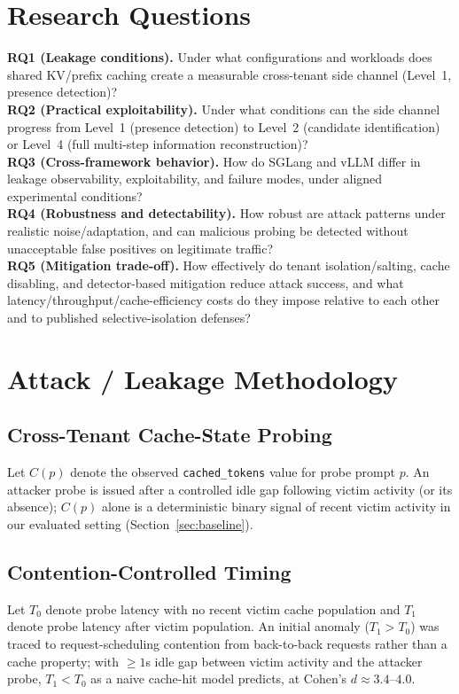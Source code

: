 \documentclass[11pt]{article}
\begin{document}
\section{Research Questions}
\textbf{RQ1 (Leakage conditions).} Under what configurations and workloads
does shared KV/prefix caching create a measurable cross-tenant side
channel (Level~1, presence detection)?\\
\textbf{RQ2 (Practical exploitability).} Under what conditions can the side
channel progress from Level~1 (presence detection) to Level~2 (candidate
identification) or Level~4 (full multi-step information reconstruction)?\\
\textbf{RQ3 (Cross-framework behavior).} How do SGLang and vLLM differ in
leakage observability, exploitability, and failure modes, under aligned
experimental conditions?\\
\textbf{RQ4 (Robustness and detectability).} How robust are attack patterns
under realistic noise/adaptation, and can malicious probing be detected
without unacceptable false positives on legitimate traffic?\\
\textbf{RQ5 (Mitigation trade-off).} How effectively do tenant
isolation/salting, cache disabling, and detector-based mitigation reduce
attack success, and what latency/throughput/cache-efficiency costs do they
impose relative to each other and to published selective-isolation
defenses?

\section{Attack / Leakage Methodology}
\subsection{Cross-Tenant Cache-State Probing}
Let $C(p)$ denote the observed \texttt{cached\_tokens} value for probe
prompt $p$. An attacker probe is issued after a controlled idle gap
following victim activity (or its absence); $C(p)$ alone is a
deterministic binary signal of recent victim activity in our evaluated
setting (Section~\ref{sec:baseline}).

\subsection{Contention-Controlled Timing}
Let $T_0$ denote probe latency with no recent victim cache population
and $T_1$ denote probe latency after victim population. An initial
anomaly ($T_1 > T_0$) was traced to request-scheduling contention from
back-to-back requests rather than a cache property; with $\geq 1$s idle
gap between victim activity and the attacker probe, $T_1 < T_0$ as a
naive cache-hit model predicts, at Cohen's $d\approx 3.4$--$4.0$.
\end{document}
